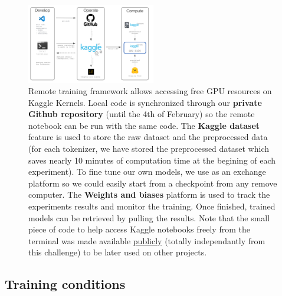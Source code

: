 \begin{figure}
    \centering
    \includegraphics[width=0.5\textwidth]{figures/training_framework.png}
    \caption{Remote training framework allows accessing free GPU resources on Kaggle Kernels. Local code is synchronized through our \textbf{private Github repository} (until the 4th of February) so the remote notebook can be run with the same code. The \textbf{Kaggle dataset} feature is used to store the raw dataset and the preprocessed data (for each tokenizer, we have stored the preprocessed dataset which saves nearly 10 minutes of computation time at the begining of each experiment). To fine tune our own models, we use  as an exchange platform so we could easily start from a checkpoint from any remove computer. The \textbf{Weights and biases} platform is used to track the experiments results and monitor the training. Once finished, trained models can be retrieved by pulling the results.
    Note that the small piece of code to help access Kaggle notebooks freely from the terminal was made available \href{https://github.com/balthazarneveu/mva\_pepites}{publicly} (totally independantly from this challenge) to be later used on other projects.
    }
    \label{fig:framework}
\end{figure}

\subsection*{Training conditions}
\label{sec:training conditions}

